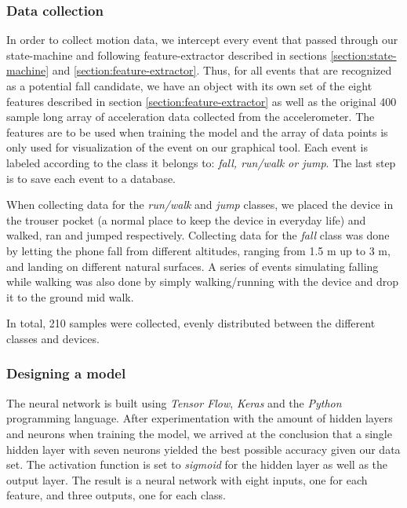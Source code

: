 \documentclass[12pt, a4paper, onecolumn]{article}
\begin{document}
	\subsubsection{Data collection}
	In order to collect motion data, we intercept every event that passed through our state-machine and following feature-extractor described in sections \ref{section:state-machine} and \ref{section:feature-extractor}. Thus, for all events that are recognized as a potential fall candidate, we have an object with its own set of the eight features described in section \ref{section:feature-extractor} as well as the original 400 sample long array of acceleration data collected from the accelerometer. The features are to be used when training the model and the array of data points is only used for visualization of the event on our graphical tool. Each event is labeled according to the class it belongs to: \textit{fall, run/walk or jump}. The last step is to save each event to a database. 
	
	When collecting data for the \textit{run/walk} and \textit{jump} classes, we placed the device in the trouser pocket (a normal place to keep the device in everyday life) and walked, ran and jumped respectively. Collecting data for the \textit{fall} class was done by letting the phone fall from different altitudes, ranging from 1.5 m up to 3 m, and landing on different natural surfaces. A series of events simulating falling while walking was also done by simply walking/running with the device and drop it to the ground mid walk.
	
	In total, 210 samples were collected, evenly distributed between the different classes and devices.
	
	\subsubsection{Designing a model}
	The neural network is built using \textit{Tensor Flow}, \textit{Keras} and the \textit{Python} programming language. After experimentation with the amount of hidden layers and neurons when training the model, we arrived at the conclusion that a single hidden layer with seven neurons yielded the best possible accuracy given our data set. The activation function is set to \textit{sigmoid} for the hidden layer as well as the output layer. The result is a neural network with eight inputs, one for each feature, and three outputs, one for each class. 
	
\end{document}
